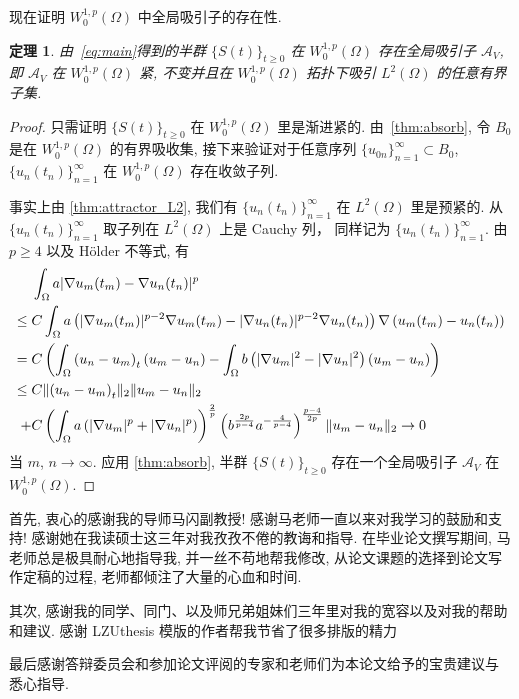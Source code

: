\documentclass[twoside,longtitle]{LZUthesis}
\newtheorem{theorem}{定理}[chapter]
\theoremstyle{definition}
\numberwithin{equation}{chapter}
\newcommand*\abs[1]{\lvert#1\rvert}
\newcommand*\norm[1]{\lVert#1\rVert}
\newcommand*\Brace[1]{\lbrace#1\rbrace}
\begin{document}
现在证明
$W_0^{1,p}(\Omega)$ 中全局吸引子的存在性.
\begin{theorem}
	由~\cref{eq:main}得到的半群 $\Brace{S(t)}_{t \geq 0}$ 在 $W_0^{1,p}(\Omega)$
	存在全局吸引子 $\mathcal{A}_V$, 即
	$\mathcal{A}_V$ 在 $W_0^{1,p}(\Omega)$ 紧, 不变并且在 $W_0^{1,p}(\Omega)$
	拓扑下吸引 $L^2(\Omega)$ 的任意有界子集.
\end{theorem}
\begin{proof}
	只需证明 $\Brace{S(t)}_{t \geq 0}$ 在 $W_0^{1,p}(\Omega)$ 里是渐进紧的.
	由~\cref{thm:absorb}, 令 $B_0$ 是在 $W_0^{1,p}(\Omega)$ 的有界吸收集,
	接下来验证对于任意序列
	$\Brace{u_{0n}}_{n=1}^{\infty} \subset B_0$, $\Brace{u_n(t_n)}_{n=1}^{\infty}$
	在 $W_0^{1,p}(\Omega)$ 存在收敛子列.

	事实上由 \cref{thm:attractor_L2}, 我们有
	$\Brace{u_n(t_n)}_{n=1}^{\infty}$ 在 $L^2(\Omega)$ 里是预紧的.
	从 $\Brace{u_n(t_n)}_{n=1}^{\infty}$ 取子列在 $L^2(\Omega)$ 上是 Cauchy 列，
	同样记为 $\Brace{u_n(t_n)}_{n=1}^{\infty}$. 由 $p \geq 4$ 以及
	H\"older 不等式, 有
	\begin{equation*}
		\begin{split}
			& \int_{\Omega}a\abs{\nabla u_m(t_m) - \nabla u_n(t_n)}^p\\
			\leq{} & C\int_{\Omega}a
			\left(\abs{\nabla u_m(t_m)}^{p-2}\nabla u_m(t_m)
			- \abs{\nabla u_n(t_n)}^{p-2}\nabla u_n(t_n)\right)
			\*\nabla\left(u_m(t_m) - u_n(t_n)\right)\\
			={} & C\left(\int_{\Omega}\left(u_n-u_m\right)_t\left(u_m-u_n\right)
			- \int_{\Omega}b\left(\abs{\nabla u_m}^2 - \abs{\nabla u_n}^2\right)
			\left(u_m - u_n\right)\right)\\
			\leq{} & C\norm{\left(u_n-u_m\right)_t}_2\norm{u_m-u_n}_2\\
			+{} & C\left(\int_{\Omega}a\left(\abs{\nabla u_m}^p
			+ \abs{\nabla u_n}^p\right)\right)^{\frac{2}{p}}
			\left(b^{\frac{2p}{p-4}}a^{-\frac{4}{p-4}}\right)^{\frac{p-4}{2p}}
			\norm{u_m-u_n}_2 \to 0
		\end{split}
	\end{equation*}
	当 $m$, $n \to \infty$. 应用 \cref{thm:absorb}, 半群 $\Brace{S(t)}_{t \geq 0}$
	存在一个全局吸引子 $\mathcal{A}_V$ 在 $W_0^{1,p}(\Omega)$.
\end{proof}

\appendix




\begin{thanks}
首先, 衷心的感谢我的导师马闪副教授! 感谢马老师一直以来对我学习的鼓励和支持!
感谢她在我读硕士这三年对我孜孜不倦的教诲和指导.
在毕业论文撰写期间, 马老师总是极具耐心地指导我, 并一丝不苟地帮我修改,
从论文课题的选择到论文写作定稿的过程, 老师都倾注了大量的心血和时间.

其次, 感谢我的同学、同门、以及师兄弟姐妹们三年里对我的宽容以及对我的帮助和建议.
感谢 LZUthesis 模版的作者帮我节省了很多排版的精力

最后感谢答辩委员会和参加论文评阅的专家和老师们为本论文给予的宝贵建议与
悉心指导.

\end{thanks}
\end{document}
